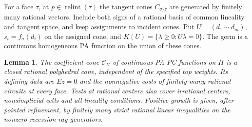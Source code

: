 \documentclass[11pt]{article}
\newtheorem{lemma}[theorem]{Lemma}
\newcommand{\relint}{\operatorname{relint}}
\begin{document}
For a face $\tau$, at $p\in\relint(\tau)$ the tangent cones
$C_{\sigma/\tau}$ are generated by finitely many rational vectors.
Include both signs of a rational basis of common lineality and tangent
space, and keep assignments to incident cones. Put $U=(d_1\ \cdots\ d_m)$,
$s_i=f_\sigma(d_i)$ on the assigned cone, and
$K(U)=\{\lambda\geq0:U\lambda=0\}$. The germ is a continuous
homogeneous PA function on the union of these cones.

\begin{lemma}\label{cone}
The coefficient cone $\mathcal C_\Pi$ of continuous PA PC functions
on $\Pi$ is a closed rational polyhedral cone, independent of the
specified top weights. Its defining data are $Ez=0$ and the
nonnegative costs of finitely many rational circuits at \emph{every}
face. Tests at rational centers also cover irrational centers,
nonsimplicial cells and all lineality conditions. Positive growth
is given, after pointed refinement, by finitely many strict rational
linear inequalities on the nonzero recession-ray generators.
\end{lemma}
\end{document}
